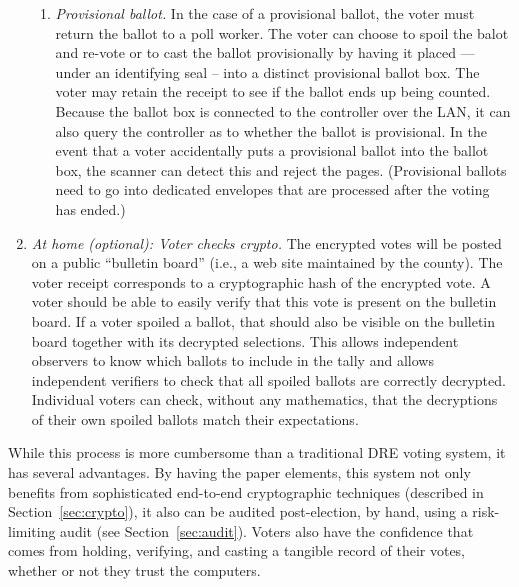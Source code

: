 \begin{enumerate}
\begin{enumerate}
\item {\em Provisional ballot.}
In the case of a provisional ballot, the voter must return the ballot to a poll worker.  The voter can choose to spoil the
balot and re-vote or to cast the ballot provisionally by
having it placed --- under an identifying seal -- into a distinct provisional ballot box. The voter may retain
the receipt to see if the ballot ends up being counted. Because the
ballot box is connected to the controller over the LAN, it can also
query the controller as to whether the ballot is provisional. In the
event that a voter accidentally puts a provisional ballot into the
ballot box, the scanner can detect this and reject the
pages. (Provisional ballots need to go into dedicated envelopes that
are processed after the voting has ended.)
\end{enumerate}

\item {\em At home (optional): Voter checks crypto.}
The encrypted votes will be posted on a public ``bulletin board''
 (i.e., a web site maintained by the county).
 The voter receipt corresponds to a cryptographic hash of the encrypted vote.
 A voter should be able to easily verify that this vote is present on the bulletin board.
 If a voter spoiled a ballot, that should also be visible on the bulletin board
 together with its decrypted selections.  
 This allows independent observers to
 know which ballots to include in the tally and allows independent verifiers
 to check that all spoiled ballots are correctly decrypted.  
 Individual voters can
 check, without any mathematics,
 that the decryptions of their own spoiled ballots match their expectations.
\end{enumerate}


While this process is more cumbersome than a traditional DRE voting
system, it has several advantages. By having the paper elements,
this system not only benefits from sophisticated end-to-end cryptographic
techniques (described in Section~\ref{sec:crypto}), it also can be
audited post-election, by hand, using a risk-limiting audit
(see Section~\ref{sec:audit}). 
Voters also have the confidence that
comes from holding, verifying, and casting a tangible record of their
votes, whether or not they trust the computers.


